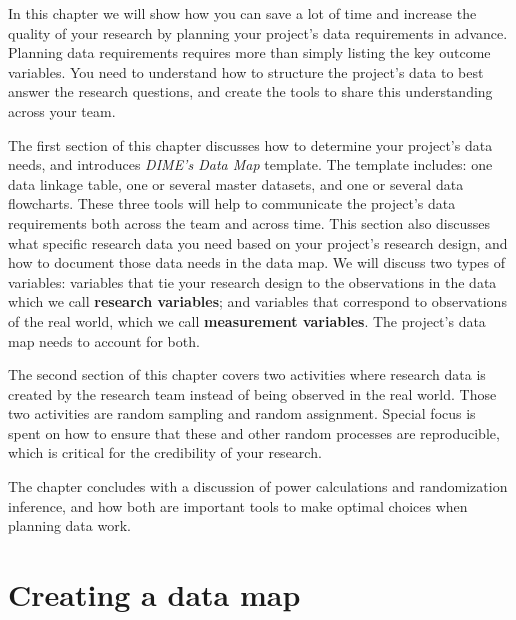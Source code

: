 
\begin{fullwidth}

In this chapter we will show how you can save a lot of time
and increase the quality of your research by
planning your project's data requirements in advance.
Planning data requirements requires more than
simply listing the key outcome variables.
You need to understand how to structure the project's data
to best answer the research questions,
and create the tools to share this understanding across your team.

The first section of this chapter discusses how to
determine your project's data needs,
and introduces \textit{DIME's Data Map} template.
The template includes:
one data linkage table,
one or several master datasets, and
one or several data flowcharts.
These three tools will help to communicate the project's data requirements
both across the team and across time.
This section also discusses what specific research data you need
based on your project's research design,
and how to document those data needs in the data map.
We will discuss two types of variables:
variables that tie your research design
to the observations in the  data
which we call \textbf{research variables};
and variables that correspond to observations of the real world,
which we call \textbf{measurement variables}.
The project's data map needs to account for both.

The second section of this chapter covers two activities where
research data is created by the research team
instead of being observed in the real world.
Those two activities are random sampling and random assignment.
Special focus is spent on how to ensure that
these and other random processes are reproducible,
which is critical for the credibility of your research.

The chapter concludes with a discussion of power calculations and randomization inference,
and how both are important tools to make optimal choices when planning data work.


\end{fullwidth}


\section{Creating a data map}

